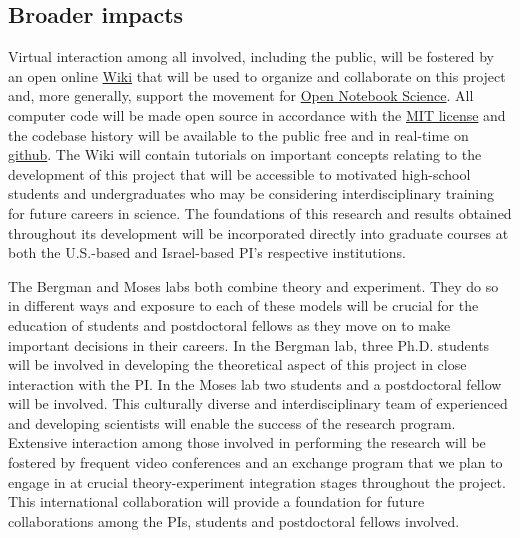 \subsection{Broader impacts}
\noindent Virtual interaction among all involved, including the public, will be fostered by an open online \href{http://en.wikipedia.org/wiki/Wiki}{Wiki} that will be used to organize and collaborate on this project and, more generally, support the movement for \href{http://en.wikipedia.org/wiki/Open\_notebook\_science}{Open Notebook Science}. All computer code will be made open source in accordance with the \href{http://opensource.org/licenses/MIT}{MIT license} and the codebase history will be available to the public free and in real-time on \href{http://www.github.com}{github}. The Wiki will contain tutorials on important concepts relating to the development of this project that will be accessible to motivated high-school students and undergraduates who may be considering interdisciplinary training for future careers in science. The foundations of this research and results obtained throughout its development will be incorporated directly into graduate courses at both the U.S.-based and Israel-based PI’s respective institutions. 

The Bergman and Moses labs both combine theory and experiment. They do so in different ways and exposure to each of these models will be crucial for the education of students and postdoctoral fellows as they move on to make important decisions in their careers. In the Bergman lab, three Ph.D. students will be involved in developing the theoretical aspect of this project in close interaction with the PI. In the Moses lab two students and a postdoctoral fellow will be involved. This culturally diverse and interdisciplinary team of experienced and developing scientists will enable the success of the research program. Extensive interaction among those involved in performing the research will be fostered by frequent video conferences and an exchange program that we plan to engage in at crucial theory-experiment integration stages throughout the project. This international collaboration will provide a foundation for future collaborations among the PIs, students and postdoctoral fellows involved.
\pagebreak